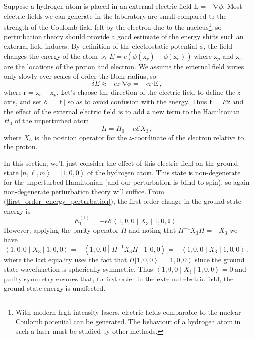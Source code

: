 \documentclass{article}
\theoremstyle{plain}\theoremheaderfont{\normalfont\itshape}\theorembodyfont{\rmfamily}\theoremseparator{.}\newtheorem*{rem}{Remark}\newtheorem*{ex}{Example}\newtheorem*{proof}{Proof}\newtheorem*{altp}{Alternative proof}
\theoremstyle{plain}\theoremheaderfont{\normalfont\bfseries}\theorembodyfont{\rmfamily}\theoremseparator{.}\newtheorem{thm}{Theorem}[section]\newtheorem{lem}[thm]{Lemma}\newtheorem{prop}[thm]{Proposition}\newtheorem*{cor}{Corollary}\newtheorem{defn}[thm]{Definition}\newtheorem{clm}[thm]{Claim}\newtheorem{clminproof}{Claim}
\theoremstyle{break}\theoremheaderfont{\normalfont\itshape}\theorembodyfont{\rmfamily}\theoremseparator{.\medskip}\newtheorem*{proofskip}{Proof}\newtheorem*{exs}{Examples}\newtheorem*{rems}{Remarks}
\theoremstyle{break}\theoremheaderfont{\normalfont\bfseries}\theorembodyfont{\rmfamily}\theoremseparator{.\medskip}\newtheorem{lemskip}[thm]{Lemma}\newtheorem{defnskip}[thm]{Definition}\newtheorem{propskip}[thm]{Proposition}\newtheorem{thmskip}[thm]{Theorem}
\numberwithin{equation}{section}
\newcommand{\ket}[1]{\left| #1 \right\rangle}
\newcommand{\expval}[2]{\left\langle #2 \middle| #1 \middle| #2 \right\rangle}
\newcommand{\vb}[1]{\bm{\mathrm{#1}}}
\newcommand{\vu}[1]{\hat{\bm{\mathrm{#1}}}}
\newcommand{\vdot}{\bm{\cdot}}
\newcommand{\abs}[1]{\left| #1 \right|}
\newcommand{\grad}{\vb{\nabla}}
\begin{document}
    Suppose a hydrogen atom is placed in an external electric field \(\vb{E}=-\grad\phi\). Most electric fields we can generate in the laboratory are small compared to the strength of the Coulomb field felt by the electron due to the nucleus\footnote{With modern high intensity lasers, electric fields comparable to the nuclear Coulomb potential can be generated. The behaviour of a hydrogen atom in such a laser must be studied by other methods.}, so perturbation theory should provide a good estimate of the energy shifts such an external field induces. By definition of the electrostatic potential \(\phi\), the field changes the energy of the atom by \(E=e(\phi(\vb{x}_p)-\phi(\vb{x}_e))\) where \(\vb{x}_p\) and \(\vb{x}_e\) are the locations of the proton and electron. We assume the external field varies only slowly over scales of order the Bohr radius, so
    \begin{equation}
        \delta E\approx -e\vb{r}\vdot\grad\phi=-e\vb{r}\vdot\vb{E}\,,
    \end{equation}
    where \(\vb{r}=\vb{x}_e-\vb{x}_p\). Let's choose the direction of the electric field to define the \(z\)-axis, and set \(\mathcal{E}=\abs{\vb{E}}\) so as to avoid confusion with the energy. Thus \(\vb{E}=\mathcal{E}\vu{z}\) and the effect of the external electric field is to add a new term to the Hamiltonian \(H_0\) of the unperturbed atom
    \begin{equation}
        H=H_0-e\mathcal{E}X_3\,,
    \end{equation}
    where \(X_3\) is the position operator for the \(z\)-coordinate of the electron relative to the proton.

    In this section, we'll just consider the effect of this electric field on the ground state \(\ket{n,\ell,m}=\ket{1,0,0}\) of the hydrogen atom. This state is non-degenerate for the unperturbed Hamiltonian (and our perturbation is blind to spin), so again non-degenerate perturbation theory will suffice. From (\ref{first_order_energy_perturbation}), the first order change in the ground state energy is
    \begin{equation}
        E_1^{(1)}=-e\mathcal{E}\expval{X_3}{1,0,0}\,.
    \end{equation}
    However, applying the parity operator \(\Pi\) and noting that \(\Pi^{-1}X_3\Pi=-X_3\) we have
    \begin{equation}
        \expval{X_3}{1,0,0}=-\expval{\Pi^{-1}X_3\Pi}{1,0,0}=-\expval{X_3}{1,0,0}\,,
    \end{equation}
    where the last equality uses the fact that \(\Pi\ket{1,0,0}=\ket{1,0,0}\) since the ground state wavefunction is spherically symmetric. Thus \(\expval{X_3}{1,0,0}=0\) and parity symmetry ensures that, to first order in the external electric field, the ground state energy is unaffected.
\end{document}
